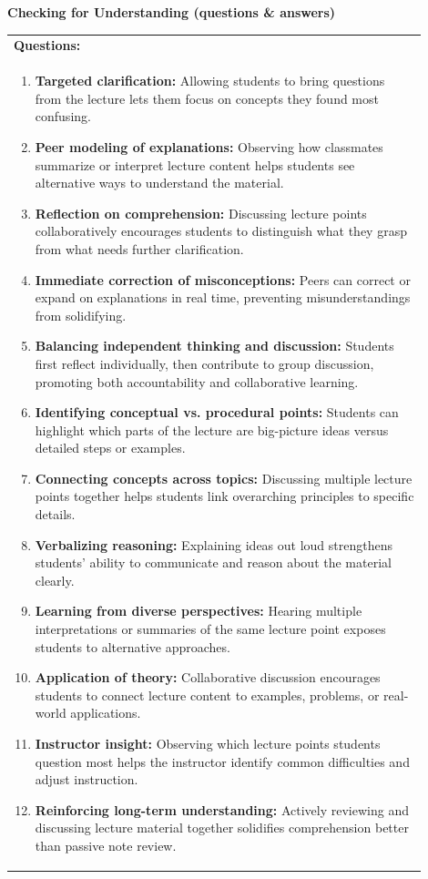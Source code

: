 \documentclass{article}
\begin{document}
\newpage
\noindent
{\large\textbf{Checking for Understanding (questions \& answers)}}\\[0.2em]
\noindent
\begin{tabular}{|p{0.9\linewidth}|}
\hline
\textbf{Questions:} \\
\begin{enumerate}
    \item \textbf{Targeted clarification:} Allowing students to bring questions from the lecture lets them focus on concepts they found most confusing.
    \item \textbf{Peer modeling of explanations:} Observing how classmates summarize or interpret lecture content helps students see alternative ways to understand the material.
    \item \textbf{Reflection on comprehension:} Discussing lecture points collaboratively encourages students to distinguish what they grasp from what needs further clarification.
    \item \textbf{Immediate correction of misconceptions:} Peers can correct or expand on explanations in real time, preventing misunderstandings from solidifying.
    \item \textbf{Balancing independent thinking and discussion:} Students first reflect individually, then contribute to group discussion, promoting both accountability and collaborative learning.
    \item \textbf{Identifying conceptual vs. procedural points:} Students can highlight which parts of the lecture are big-picture ideas versus detailed steps or examples.
    \item \textbf{Connecting concepts across topics:} Discussing multiple lecture points together helps students link overarching principles to specific details.
    \item \textbf{Verbalizing reasoning:} Explaining ideas out loud strengthens students’ ability to communicate and reason about the material clearly.
    \item \textbf{Learning from diverse perspectives:} Hearing multiple interpretations or summaries of the same lecture point exposes students to alternative approaches.
    \item \textbf{Application of theory:} Collaborative discussion encourages students to connect lecture content to examples, problems, or real-world applications.
    \item \textbf{Instructor insight:} Observing which lecture points students question most helps the instructor identify common difficulties and adjust instruction.
    \item \textbf{Reinforcing long-term understanding:} Actively reviewing and discussing lecture material together solidifies comprehension better than passive note review.
\end{enumerate} \\
\hline  
\end{tabular}
\end{document}
